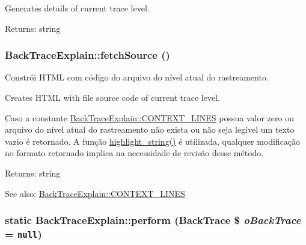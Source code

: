 Generates details of current trace level.

\begin{Desc}
\item[Returns:]string \end{Desc}
\hypertarget{class_back_trace_explain_bcec7ab0fe0e54f33cdd7b5e3df5bc8c}{
\subsubsection[{fetchSource}]{\setlength{\rightskip}{0pt plus 5cm}BackTraceExplain::fetchSource ()}}
\label{class_back_trace_explain_bcec7ab0fe0e54f33cdd7b5e3df5bc8c}


Constrói HTML com código do arquivo do nível atual do rastreamento.

Creates HTML with file source code of current trace level.

Caso a constante \hyperlink{class_back_trace_explain_a43a9dad0003990817f208568687ef4b}{BackTraceExplain::CONTEXT\_\-LINES} possua valor zero ou arquivo do nível atual do rastreamento não exista ou não seja legível um texto vazio é retornado. A função \hyperlink{}{highlight\_\-string()} é utilizada, qualquer modificação no formato retornado implica na necessidade de revisão desse método.

\begin{Desc}
\item[Returns:]string \end{Desc}
\begin{Desc}
\item[See also:]\hyperlink{class_back_trace_explain_a43a9dad0003990817f208568687ef4b}{BackTraceExplain::CONTEXT\_\-LINES} \end{Desc}
\hypertarget{class_back_trace_explain_7c43123f132faff85e225130dcdff9ec}{
\subsubsection[{perform}]{\setlength{\rightskip}{0pt plus 5cm}static BackTraceExplain::perform ({\bf BackTrace} \$ {\em oBackTrace} = {\tt null})}}
\label{class_back_trace_explain_7c43123f132faff85e225130dcdff9ec}


